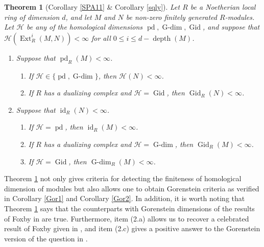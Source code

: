 \documentclass[11pt, a4paper,pagebackref]{amsart}
\numberwithin{equation}{section}
\newtheorem{theorem}{Theorem}[section]
\theoremstyle{definition}
\newtheorem{remark and definition}[theorem]{Remark and Definition}
\newtheorem{remark and notation}[theorem]{Remark and Notation}
\newcommand\Ext{\operatorname{Ext}}
\begin{document}
\begin{theorem}[{\rm Corollary \ref{SPA11} \& Corollary \ref{sqly}}]\label{main1}
    Let $R$ be a Noetherian  local ring of dimension $d$, and let $M$ and $N$ be non-zero finitely generated $R$-modules. Let $\mathcal{H}$ be any of the homological dimensions $\operatorname{pd}, \operatorname{G-dim}, \operatorname{Gid}$, and suppose that  $\mathcal{H}(\Ext_R^i(M,N))<\infty$ for all $0\leq i \leq d-\operatorname{depth} (M)$.
    \begin{enumerate}[ \rm (1)]
        \item Suppose that $\operatorname{pd}_R (M)<\infty$.
        \begin{enumerate}[\rm ({1}.a)]
            \item If $\mathcal{H}\in  \{\operatorname{pd},\operatorname{G-dim}\}$, then $\mathcal{H}(N)<\infty$. 
            \item If $R$ has a dualizing complex and $\mathcal{H}=\operatorname{Gid}$, then $\operatorname{Gid}_R(N)<\infty$.  
        \end{enumerate}
        \item Suppose that $\operatorname{id}_R (N)<\infty$.
        \begin{enumerate}[\rm ({2}.a)]
            \item If $\mathcal{H}= \operatorname{pd}$, then $\operatorname{id}_R(M)<\infty$. 
            \item If $R$ has a dualizing complex and $\mathcal{H}=\operatorname{G-dim}$, then $\operatorname{Gid}_R (M)<\infty$. 
            \item If $\mathcal{H}=\operatorname{Gid}$, then $\operatorname{G-dim}_R(M)<\infty$.  
        \end{enumerate}
    \end{enumerate}
\end{theorem}


Theorem \ref{main1} not only gives criteria for detecting the finiteness of homological dimension of modules but also allows one to obtain Gorenstein criteria as verified in Corollary \ref{Gor1} and Corollary \ref{Gor2}. In addition, it is worth noting that Theorem \ref{main1} says that the counterparts with Gorenstein dimensions of the results of Foxby in  \cite[Proposition 3.5(b)]{onthemuiinaminimalinjectiveresolution} are true. Furthermore, item (2.a) allows us to recover a celebrated result of Foxby given in \cite[Corollary 4.4]{isomorphismsbetweencomplexeswithapplicationstothehomologicaltheoryofmodules}, and item (2.c) gives a positive answer to the Gorenstein version of the question in \cite[Question 4.5]{GorensteinringsviahomologicaldimensionsandsymmetryinvanishingofExtandTatecohomology}. 
\end{document}

